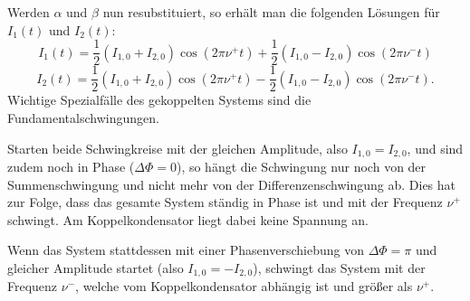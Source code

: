 Werden $\alpha$ und $\beta$ nun resubstituiert, so erhält man die folgenden Lösungen
für $I_1(t)$ und $I_2(t)$:
\begin{equation}
  I_1(t) = \frac{1}{2} (I_{1,0} + I_{2,0}) \cos(2\pi\nu^{+}t)
  + \frac{1}{2} (I_{1,0} - I_{2,0}) \cos(2\pi\nu^{-}t)
  \label{eqn:I1}
\end{equation}
\begin{equation}
  I_2(t) = \frac{1}{2} (I_{1,0} + I_{2,0}) \cos(2\pi\nu^{+}t)
  - \frac{1}{2} (I_{1,0} - I_{2,0}) \cos(2\pi\nu^{-}t).
  \label{eqn:I2}
\end{equation}
Wichtige Spezialfälle des gekoppelten Systems sind die Fundamentalschwingungen.

Starten beide Schwingkreise mit der gleichen Amplitude, also $I_{1,0} = I_{2,0}$,
und sind zudem noch in Phase ($\Delta \Phi = 0$), so hängt die Schwingung nur noch
von der Summenschwingung und nicht mehr von der Differenzenschwingung ab. Dies
hat zur Folge, dass das gesamte System ständig in Phase ist und mit der Frequenz
$\nu^{+}$ schwingt. Am Koppelkondensator liegt dabei keine Spannung an.

Wenn das System stattdessen mit einer Phasenverschiebung von $\Delta \Phi = \pi$
und gleicher Amplitude startet (also $I_{1,0} = - I_{2,0}$), schwingt das System
mit der Frequenz $\nu^{-}$, welche vom Koppelkondensator abhängig ist und größer
als $\nu^{+}$.

